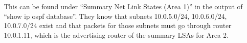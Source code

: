 This can be found under ``Summary Net Link States (Area 1)'' in the output of ``show ip ospf database''.
They know that subnets 10.0.5.0/24, 10.0.6.0/24, 10.0.7.0/24 exist and that packets for those subnets must go through router 10.0.1.11, which is the advertising router of the summary LSAs for Area 2.
